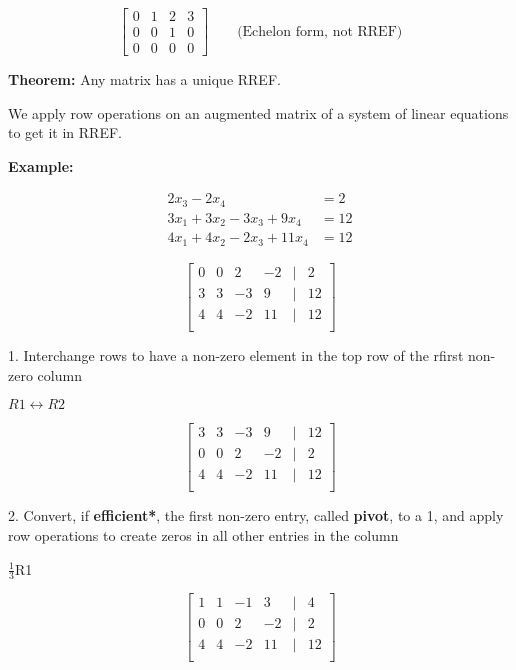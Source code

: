 \documentclass{article}
\begin{document}
\[
\begin{bmatrix}
  0 & 1 & 2 & 3 \\
  0 & 0 & 1 & 0 \\
  0 & 0 & 0 & 0
\end{bmatrix}
\qquad \text{(Echelon form, not RREF)}
\]

\medskip

\textbf{Theorem:} Any matrix has a unique RREF.

\medskip

We apply row operations on an augmented matrix of a system of linear equations to get it in RREF.

\medskip

\textbf{Example:}


\begin{align*}
2x_3 - 2x_4 &= 2 \\
3x_1 + 3x_2 - 3x_3 + 9x_4 &= 12 \\
4x_1 + 4x_2 - 2x_3 + 11x_4 &= 12
\end{align*}


\[
\begin{bmatrix}
    0 & 0 & 2 & -2 & | & 2 \\
    3 & 3 & -3 & 9 & | & 12 \\
    4 & 4 & -2 & 11 & | & 12 \\
\end{bmatrix}
\] 


1. Interchange rows to have a non-zero element in the top row of the rfirst non-zero column

$R1 \leftrightarrow R2$

\[
\begin{bmatrix}
    3 & 3 & -3 & 9 & | & 12 \\
    0 & 0 & 2 & -2 & | & 2 \\
    4 & 4 & -2 & 11 & | & 12 \\
\end{bmatrix}
\] 

2. Convert, if \textbf{efficient*}, the first non-zero entry, called \textbf{pivot}, to a 1, and apply row operations to create zeros in all other entries in the column


$\frac{1}{3}$R1

\[
\begin{bmatrix}
    1 & 1 & -1 & 3 & | & 4 \\
    0 & 0 & 2 & -2 & | & 2 \\
    4 & 4 & -2 & 11 & | & 12 \\
\end{bmatrix}
\] 
\end{document}
